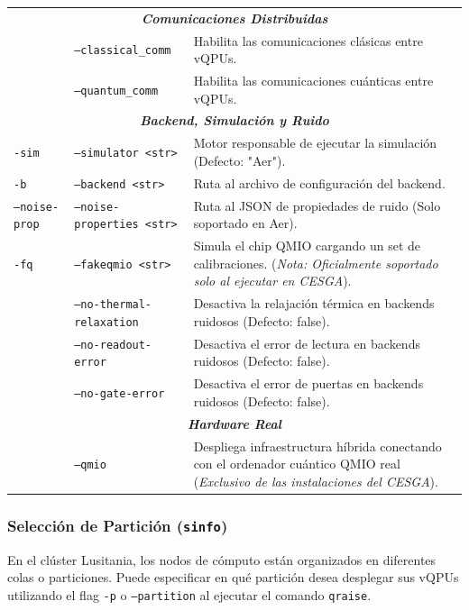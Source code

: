 \documentclass[a4paper,11pt]{article}
\begin{document}
\begin{center}
\begin{tabular}{@{} l p{4.8cm} p{8.0cm} @{}}
    \multicolumn{3}{c}{\textbf{\textit{Comunicaciones Distribuidas}}} \\
    \texttt{} & \texttt{--classical\_comm} & Habilita las comunicaciones clásicas entre vQPUs. \\
    \texttt{} & \texttt{--quantum\_comm} & Habilita las comunicaciones cuánticas entre vQPUs. \\
    \midrule
    
    \multicolumn{3}{c}{\textbf{\textit{Backend, Simulación y Ruido}}} \\
    \texttt{-sim} & \texttt{--simulator <str>} & Motor responsable de ejecutar la simulación (Defecto: "Aer"). \\
    \texttt{-b} & \texttt{--backend <str>} & Ruta al archivo de configuración del backend. \\
    \texttt{--noise-prop} & \texttt{--noise-properties <str>} & Ruta al JSON de propiedades de ruido (Solo soportado en Aer). \\
    \texttt{-fq} & \texttt{--fakeqmio <str>} & Simula el chip QMIO cargando un set de calibraciones. (\textit{Nota: Oficialmente soportado solo al ejecutar en CESGA}). \\
    \texttt{} & \texttt{--no-thermal-relaxation} & Desactiva la relajación térmica en backends ruidosos (Defecto: false). \\
    \texttt{} & \texttt{--no-readout-error} & Desactiva el error de lectura en backends ruidosos (Defecto: false). \\
    \texttt{} & \texttt{--no-gate-error} & Desactiva el error de puertas en backends ruidosos (Defecto: false). \\
    \midrule
    
    \multicolumn{3}{c}{\textbf{\textit{Hardware Real}}} \\
    \texttt{} & \texttt{--qmio} & Despliega infraestructura híbrida conectando con el ordenador cuántico QMIO real (\textit{Exclusivo de las instalaciones del CESGA}). \\
    \bottomrule
\end{tabular}
\end{center}

\subsubsection{Selección de Partición (\texttt{sinfo})}

En el clúster Lusitania, los nodos de cómputo están organizados en diferentes colas o particiones. Puede especificar en qué partición desea desplegar sus vQPUs utilizando el flag \texttt{-p} o \texttt{--partition} al ejecutar el comando \texttt{qraise}.
\end{document}
